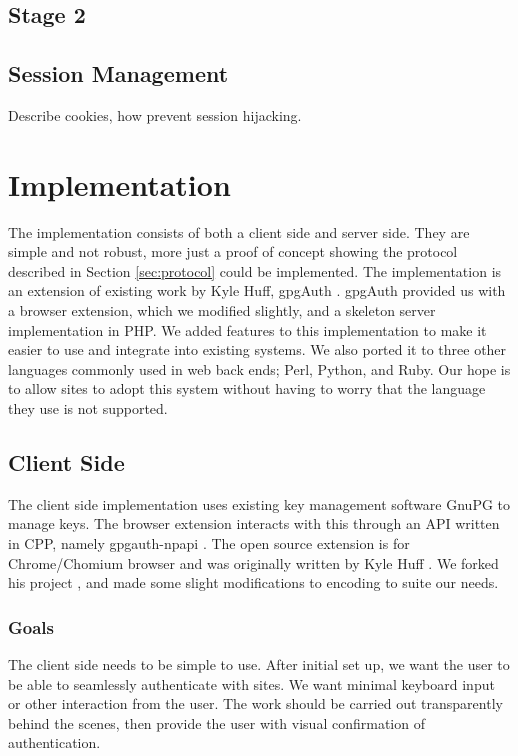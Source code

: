 \documentclass[11pt]{article}
\begin{document}
\subsection{Stage 2} \label{subsec:stage2}

\subsection{Session Management} \label{sessionManagement}
Describe cookies, how prevent session hijacking.


\section{Implementation} \label{sec:implementation}
The implementation consists of both a client side and server side. They are simple and not robust, more just a proof of concept showing the protocol described in Section \ref{sec:protocol} could be implemented. The implementation is an extension of existing work by Kyle Huff, gpgAuth \cite{gpgauth}. gpgAuth provided us with a browser extension, which we modified slightly, and a skeleton server implementation in PHP. We added features to this implementation to make it easier to use and integrate into existing systems. We also ported it to three other languages commonly used in web back ends; Perl, Python, and Ruby. Our hope is to allow sites to adopt this system without having to worry that the language they use is not supported. 

\subsection{Client Side}
The client side implementation uses existing key management software GnuPG to manage keys. The browser extension interacts with this through an API written in CPP, namely gpgauth-npapi \cite{npapi}. The open source extension is for Chrome/Chomium browser and was originally written by Kyle Huff \cite{ext}. We forked his project \cite{extFork}, and made some slight modifications to encoding to suite our needs.  
\subsubsection{Goals}
The client side needs to be simple to use. After initial set up, we want the user to be able to seamlessly authenticate with sites. We want minimal keyboard input or other interaction from the user. The work should be carried out transparently behind the scenes, then provide the user with visual confirmation of authentication.
\end{document}
